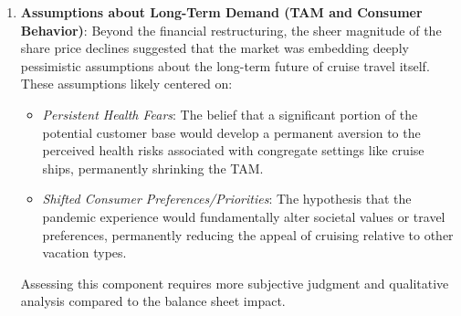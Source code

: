 \begin{enumerate}
\begin{itemize}
              \item \textit{Impact on DCF Inputs}: These actions directly and negatively impacted intrinsic equity value through several channels:
                    \begin{itemize}
                        \item Increased financial leverage (\(D/E\)) likely increased the levered beta (\(\beta_L\)).
                        \item The higher risk profile and market conditions led to a much higher cost of debt (\(C_D\)).
                        \item Both factors contributed to a significantly higher Weighted Average Cost of Capital (WACC).
                        \item Higher future interest payments reduced the Free Cash Flow available to equity (FCFE) or required higher operating performance to generate the same FCFF.
                        \item Increased share count directly reduced the calculated intrinsic value per share.
                        \item Heightened bankruptcy risk needed to be considered, potentially warranting even higher discount rates or probability-weighting scenarios.
                    \end{itemize}
                    This financial damage represented a tangible, largely quantifiable reduction in the intrinsic value per share for pre-existing equity holders.
          \end{itemize}
    \item \textbf{Assumptions about Long-Term Demand (TAM and Consumer Behavior)}: Beyond the financial restructuring, the sheer magnitude of the share price declines suggested that the market was embedding deeply pessimistic assumptions about the long-term future of cruise travel itself. These assumptions likely centered on:
          \begin{itemize}
              \item \textit{Persistent Health Fears}: The belief that a significant portion of the potential customer base would develop a permanent aversion to the perceived health risks associated with congregate settings like cruise ships, permanently shrinking the TAM.
              \item \textit{Shifted Consumer Preferences/Priorities}: The hypothesis that the pandemic experience would fundamentally alter societal values or travel preferences, permanently reducing the appeal of cruising relative to other vacation types.
          \end{itemize}
          Assessing this component requires more subjective judgment and qualitative analysis compared to the balance sheet impact.
\end{enumerate}

